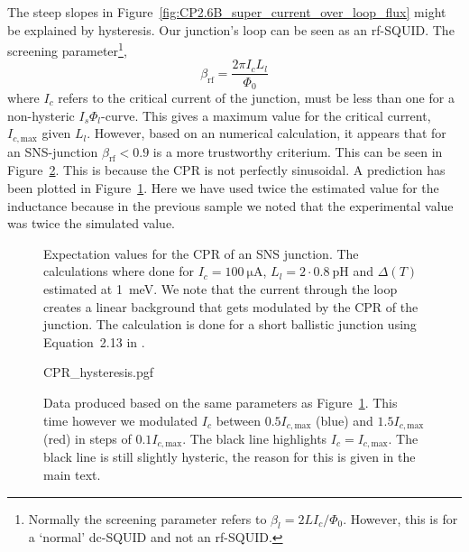 The steep slopes in Figure~\ref{fig:CP2.6B_super_current_over_loop_flux} might be explained by hysteresis. Our junction's loop can be seen as an rf-SQUID.\cite{clarkeSQUIDHandbook2004} The screening parameter\footnote{Normally the screening parameter refers to $\beta_l = 2LI_c/\Phi_0$. However, this is for a `normal' dc-SQUID and not an rf-SQUID.},
\begin{equation}
	\beta_{\text{rf}} = \frac{2\pi I_c L_l}{\Phi_0}
\end{equation}
where $I_c$ refers to the critical current of the junction, must be less than one for a non-hysteric $I_s\Phi_l$-curve\cite{clarkeSQUIDHandbook2004,frolovMeasurementCurrentPhaseRelation2004}. This gives a maximum value for the critical current, $I_{c,\text{max}}$ given $L_l$. However, based on an numerical calculation, it appears that for an SNS-junction $\beta_{\text{rf}} < 0.9$ is a more trustworthy criterium. This can be seen in Figure~\ref{fig:CPR-hysteresis}. This is because the CPR is not perfectly sinusoidal\cite{vermeerSTMbasedScanningSQUID2021,likharevSuperconductingWeakLinks1979}. A prediction has been plotted in Figure~\ref{fig:CP3.5A-analytical-prediction}. Here we have used twice the estimated value for the inductance because in the previous sample we noted that the experimental value was twice the simulated value.

\begin{figure}[ht!]
	\centering
	
	\caption{Expectation values for the CPR of an SNS junction. The calculations where done for $I_c=\qty{100}{\micro\ampere}$, $L_l=2 \cdot \qty{0.8}{\pico\henry}$ and $\Delta(T)$ estimated at \qty{1}{\milli\electronvolt}. We note that the current through the loop creates a linear background that gets modulated by the CPR of the junction. The calculation is done for a short ballistic junction using Equation~2.13 in \cite{vermeerSTMbasedScanningSQUID2021}.}
	\label{fig:CP3.5A-analytical-prediction}
\end{figure}

\begin{figure}
	\centering
	{CPR_hysteresis.pgf}
	\caption{Data produced based on the same parameters as Figure~\ref{fig:CP3.5A-analytical-prediction}. This time however we modulated $I_c$ between $0.5I_{c,\text{max}}$ (blue) and $1.5I_{c,\text{max}}$ (red) in steps of $0.1I_{c,\text{max}}$. The black line highlights $I_c=I_{c,\text{max}}$. The black line is still slightly hysteric, the reason for this is given in the main text.}
	\label{fig:CPR-hysteresis}
\end{figure}

